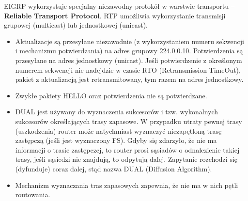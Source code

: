 \documentclass[../main.tex]{subfiles}
\begin{document}
    EIGRP wykorzystuje specjalny niezawodny protokół w warstwie transportu – \textbf{Reliable
    Transport Protocol}. RTP umożliwia wykorzystanie transmisji grupowej (multicast) lub
    jednostkowej (unicast).
    \begin{itemize}
        \item Aktualizacje są przesyłane niezawodnie (z wykorzystaniem numeru sekwencji i mechanizmu
        potwierdzania) na adres grupowy 224.0.0.10. Potwierdzenia są przesyłane na adres
        jednostkowy (unicast). Jeśli potwierdzenie z określonym numerem sekwencji nie nadejdzie w
        czasie RTO (Retransmission TimeOut), pakiet z aktualizacją jest retransmitowany, tym razem
        na adres jednostkowy.
        \item Zwykłe pakiety HELLO oraz potwierdzenia nie są potwierdzane.
        \item DUAL jest używany do wyznaczenia sukcesorów i tzw. wykonalnych
        sukcesorów określających trasy zapasowe. W przypadku utraty pewnej trasy (uszkodzenia) router może natychmiast wyznaczyć
        niezapętloną trasę zastępczą (jeśli jest wyznaczony FS).  Gdyby się zdarzyło, że nie ma
        informacji o trasie zastępczej, to router prosi sąsiadów o odnalezienie takiej trasy, jeśli
        sąsiedzi nie znajdują, to odpytują dalej. Zapytanie rozchodzi się (dyfunduje) coraz dalej, stąd
        nazwa DUAL (Diffusion Algorithm).
        \item Mechanizm wyznaczania tras zapasowych zapewnia, że nie ma w nich pętli routowania.
    \end{itemize}
\end{document}
